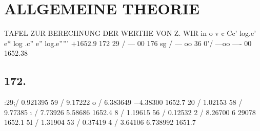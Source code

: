 \documentclass[12pt,a4paper]{article}
\begin{document}
\newpage


\section*{ALLGEMEINE THEORIE}
TAFEL ZUR BERECHNUNG DER WERTHE VON Z. WIR in o v c\textdegree{} Cc' log.e' e* log .c'' e'' log.e''''' %
$+ 1652.9$
172\textdegree{} 29 / --- 00 176\textdegree{} sg / --- oo 36\textdegree{} 0'/ ---oo ---- 00 1652.38

\subsection*{172.}
:29;/ 0.921395 59 / 9.17222 o / 6.383649
$- 4.38300$
1652.7 20 / 1.02153 58 / 9.77385 \i{} / 7.73926 5.58686 1652.4 8 /  1.19615 56 / 0.12532 2 / 8.26700 6 29078 1652.1 5I / 1.31904 53 / 0.37419 4 / 3.64106 6.738992 1651.7
\end{document}
